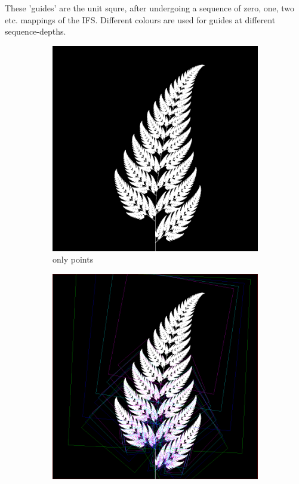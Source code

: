 \documentclass[11pt]{article}
\begin{document}
These 'guides' are the unit squre, after undergoing a sequence of zero, one, two etc. mappings of the IFS.
Different colours are used for guides at different sequence-depths.

\begin{figure}
     \centering
     \begin{subfigure}[b]{0.3\textwidth}
         \centering
         \includegraphics[width=\textwidth]{figures/barnsley_points}
         \caption{only points}
         \label{figure:barnsley_guides}
     \end{subfigure}
     \hfill
     \begin{subfigure}[b]{0.3\textwidth}
         \centering
         \includegraphics[width=\textwidth]{figures/barnsley_guides_and_points}

\end{subfigure}
\end{figure}
\end{document}
